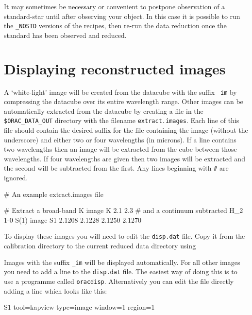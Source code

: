 \documentclass[twoside,11pt,nolof]{starlink}
\begin{document}
It may sometimes be necessary or convenient to postpone observation of
a standard-star until after observing your object. In this case it is
possible to run the \texttt{\_NOSTD} versions of the recipes, then re-run the
data reduction once the standard has been observed and reduced.



\section{Displaying reconstructed images}


A `white-light' image will be created from the datacube with the
suffix \texttt{\_im} by compressing the datacube over its entire
wavelength range. Other images can be automatically extracted from the
datacube by creating a file in the \texttt{\$ORAC\_DATA\_OUT} directory
with the filename \texttt{extract.images}. Each line of this file should
contain the desired suffix for the file containing the image (without
the underscore) and either two or four wavelengths (in microns). If a
line contains two wavelengths then an image will be extracted from the
cube between those wavelengths. If four wavelengths are given then two
images will be extracted and the second will be subtracted from the
first. Any lines beginning with \texttt{\#} are ignored.

\begin{terminalv}
      # An example extract.images file

      # Extract a broad-band K image
      K   2.1   2.3
      # and a continuum subtracted H_2 1-0 S(1) image
      S1  2.1208   2.1228   2.1250   2.1270
\end{terminalv}

To display these images you will need to edit the \texttt{disp.dat} file.
Copy it from the calibration directory to the current reduced data
directory using

\begin{terminalv}
\end{terminalv}

Images with the suffix \texttt{\_im} will be displayed automatically. For
all other images you need to add a line to the \texttt{disp.dat} file.
The easiest way of doing this is to use a programme called \texttt{oracdisp}. Alternatively you can edit the file directly adding a
line which looks like this:

\begin{terminalv}
      S1  tool=kapview type=image window=1 region=1
\end{terminalv}
\end{document}
